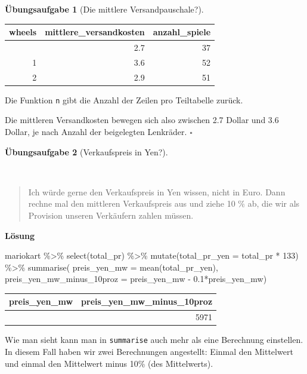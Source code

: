 \documentclass[
  letterpaper,
  twoside,
  open=any]{scrbook}
\newenvironment{Shaded}{\begin{snugshade}}{\end{snugshade}}
\newcommand{\AttributeTok}[1]{\textcolor[rgb]{0.40,0.45,0.13}{#1}}
\newcommand{\DecValTok}[1]{\textcolor[rgb]{0.68,0.00,0.00}{#1}}
\newcommand{\FloatTok}[1]{\textcolor[rgb]{0.68,0.00,0.00}{#1}}
\newcommand{\FunctionTok}[1]{\textcolor[rgb]{0.28,0.35,0.67}{#1}}
\newcommand{\NormalTok}[1]{\textcolor[rgb]{0.00,0.23,0.31}{#1}}
\newcommand{\SpecialCharTok}[1]{\textcolor[rgb]{0.37,0.37,0.37}{#1}}
\theoremstyle{definition}
\newtheorem{exercise}{Übungsaufgabe}[chapter]
\theoremstyle{definition}
\theoremstyle{definition}
\theoremstyle{remark}
\begin{document}
\begin{exercise}[Die mittlere
Versandpauschale?]
\begin{longtable}[]{@{}rrr@{}}
\toprule\noalign{}
wheels & mittlere\_versandkosten & anzahl\_spiele \\
\midrule\noalign{}
\endhead
\bottomrule\noalign{}
\endlastfoot
0 & 2.7 & 37 \\
1 & 3.6 & 52 \\
2 & 2.9 & 51 \\
\end{longtable}

Die Funktion \texttt{n} gibt die Anzahl der Zeilen pro Teiltabelle
zurück.

Die mittleren Versandkosten bewegen sich also zwischen 2.7 Dollar und
3.6 Dollar, je nach Anzahl der beigelegten Lenkräder. \(\square\)

\end{exercise}

\begin{exercise}[Verkaufspreis in
Yen?]\protect\hypertarget{exr-Forschungsfrage3}{}\label{exr-Forschungsfrage3}

~

\begin{quote}
{} Ich würde gerne den Verkaufspreis in Yen wissen, nicht
in Euro. Dann rechne mal den mittleren Verkaufspreis aus und ziehe 10 \%
ab, die wir als Provision unseren Verkäufern zahlen müssen.
\end{quote}

\textbf{Lösung}

\begin{Shaded}
\begin{Highlighting}[]
\NormalTok{mariokart }\SpecialCharTok{\%\textgreater{}\%} 
  \FunctionTok{select}\NormalTok{(total\_pr) }\SpecialCharTok{\%\textgreater{}\%} 
  \FunctionTok{mutate}\NormalTok{(}\AttributeTok{total\_pr\_yen =}\NormalTok{ total\_pr }\SpecialCharTok{*} \DecValTok{133}\NormalTok{) }\SpecialCharTok{\%\textgreater{}\%} 
  \FunctionTok{summarise}\NormalTok{(}
    \AttributeTok{preis\_yen\_mw =} \FunctionTok{mean}\NormalTok{(total\_pr\_yen),}
    \AttributeTok{preis\_yen\_mw\_minus\_10proz =}\NormalTok{ preis\_yen\_mw }\SpecialCharTok{{-}} \FloatTok{0.1}\SpecialCharTok{*}\NormalTok{preis\_yen\_mw)}
\end{Highlighting}
\end{Shaded}

\begin{longtable}[]{@{}rr@{}}
\toprule\noalign{}
preis\_yen\_mw & preis\_yen\_mw\_minus\_10proz \\
\midrule\noalign{}
\endhead
\bottomrule\noalign{}
\endlastfoot
6634 & 5971 \\
\end{longtable}

Wie man sieht kann man in \texttt{summarise} auch mehr als eine
Berechnung einstellen. In diesem Fall haben wir zwei Berechnungen
angestellt: Einmal den Mittelwert und einmal den Mittelwert minus 10\%
(des Mittelwerts).

\end{exercise}
\end{document}
